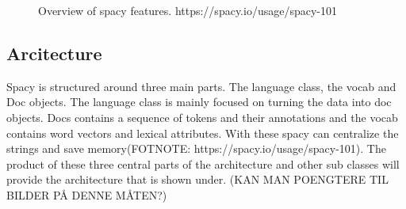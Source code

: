 \begin{figure}[h]
    \caption{Overview of spacy features. https://spacy.io/usage/spacy-101}
    \label{fig:figure2.5}
\end{figure}




\subsection{Arcitecture}\label{sec:architecture}


Spacy is structured around three main parts.
The language class, the vocab and Doc objects.
The language class is mainly focused on turning the data into doc objects.
Docs contains a sequence of tokens and their annotations and the vocab contains word vectors and lexical attributes.
With these spacy can centralize the strings and save memory(FOTNOTE: https://spacy.io/usage/spacy-101).
The product of these three central parts of the architecture and other sub classes will provide the architecture that is shown under. (KAN MAN POENGTERE TIL BILDER PÅ DENNE MÅTEN?)

